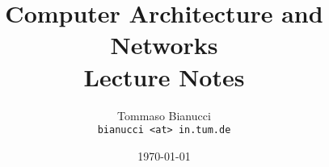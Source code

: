 
\graphicspath{ {Figures/} }

\title{Computer Architecture and Networks\\Lecture Notes}
\author{Tommaso Bianucci\\\small{\texttt{bianucci <at> in.tum.de}}}
\date{\today}


\maketitle
\tableofcontents
 


% 
% 
% 


